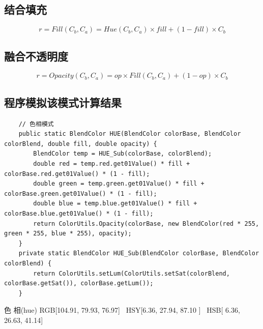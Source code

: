 \subsection{ 结合填充}

\begin{equation}r=Fill(C_b,C_a)= Hue(C_b,C_a) \times fill + (1-fill)\times C_b\end{equation}

\subsection{ 融合不透明度}

\begin{equation}r=Opacity(C_b,C_a)=op\times Fill(C_b,C_a)+(1-op)\times C_b\end{equation}
\subsection{ 程序模拟该模式计算结果}

\begin{lstlisting}
	// 色相模式
	public static BlendColor HUE(BlendColor colorBase, BlendColor colorBlend, double fill, double opacity) {
		BlendColor temp = HUE_Sub(colorBase, colorBlend);
		double red = temp.red.get01Value() * fill + colorBase.red.get01Value() * (1 - fill);
		double green = temp.green.get01Value() * fill + colorBase.green.get01Value() * (1 - fill);
		double blue = temp.blue.get01Value() * fill + colorBase.blue.get01Value() * (1 - fill);
		return ColorUtils.Opacity(colorBase, new BlendColor(red * 255, green * 255, blue * 255), opacity);
	}
	private static BlendColor HUE_Sub(BlendColor colorBase, BlendColor colorBlend) {
		return ColorUtils.setLum(ColorUtils.setSat(colorBlend, colorBase.getSat()), colorBase.getLum());
	}
\end{lstlisting}
\begin{result}
	\item  色    相(hue)           RGB[104.91,  79.93,  76.97]~ HSY[6.36,  27.94,  87.10  ]~ HSB[  6.36,  26.63,  41.14]
\end{result}
